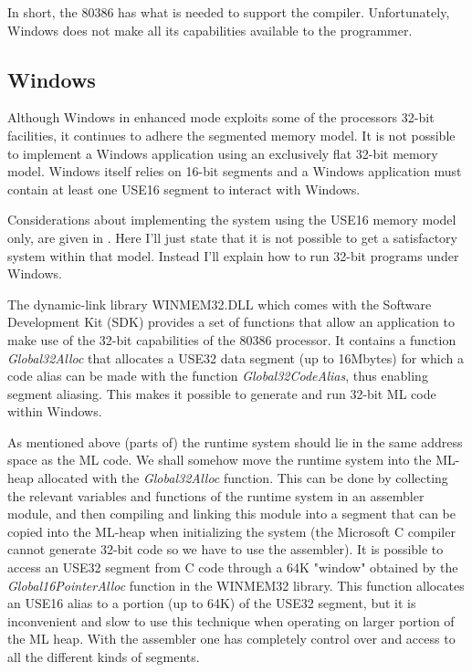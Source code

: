 In short, the 80386 has what is needed to support the compiler.
Unfortunately, Windows does not make all its capabilities available to
the programmer.

\subsection{Windows} \label{sec:windows}

Although Windows in enhanced mode exploits some of the processors
32-bit facilities, it continues to adhere the segmented memory model.
It is not possible to implement a Windows application using an
exclusively flat 32-bit memory model. Windows itself relies on 16-bit
segments and a Windows application must contain at least one USE16
segment to interact with Windows.

Considerations about implementing the system using the USE16 memory
model only, are given in \cite{bib:ysgsml}. Here I'll just state that
it is not possible to get a satisfactory system within that model.
Instead I'll explain how to run 32-bit programs under Windows.

The dynamic-link library WINMEM32.DLL which comes with the Software
Development Kit (SDK) provides a set of functions that allow an
application to make use of the 32-bit capabilities of the 80386
processor. It contains a function {\em Global32Alloc} that allocates a
USE32 data segment (up to 16Mbytes) for which a code alias can be made
with the function {\em Global32CodeAlias}, thus enabling segment
aliasing.  This makes it possible to generate and run 32-bit ML code
within Windows.

As mentioned above (parts of) the runtime system should lie in the
same address space as the ML code. We shall somehow move the runtime
system into the ML-heap allocated with the {\em Global32Alloc}
function. This can be done by collecting the relevant variables and
functions of the runtime system in an assembler module, and then
compiling and linking this module into a segment that can be copied
into the ML-heap when initializing the system (the Microsoft C
compiler cannot generate 32-bit code so we have to use the assembler).
It is possible to access an USE32 segment from C code through a 64K
"window" obtained by the {\em Global16PointerAlloc\/} function in the
WINMEM32 library. This function allocates an USE16 alias to a portion
(up to 64K) of the USE32 segment, but it is inconvenient and slow to
use this technique when operating on larger portion of the ML heap.
With the assembler one has completely control over and access to all
the different kinds of segments.

